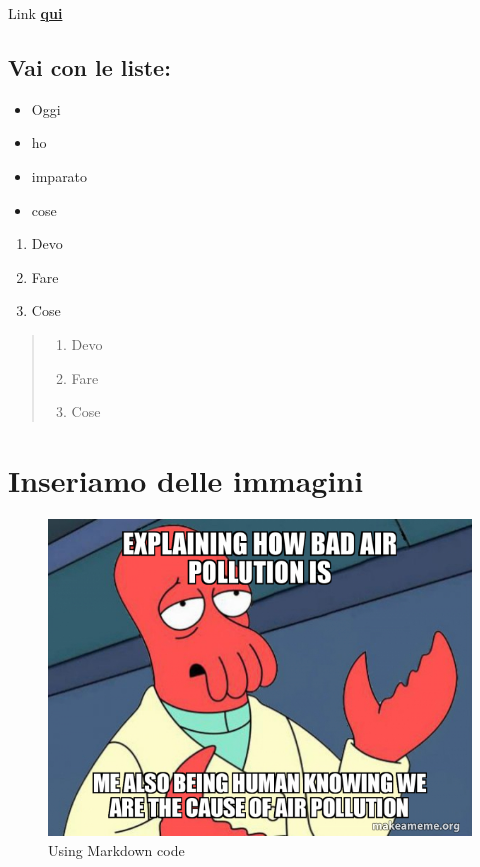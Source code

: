 \documentclass[
]{article}
\providecommand{\tightlist}{%
  \setlength{\itemsep}{0pt}\setlength{\parskip}{0pt}}
\begin{document}
Link \href{https://www.google.com}{\textbf{qui}}

\hypertarget{vai-con-le-liste}{%
\subsection{Vai con le liste:}\label{vai-con-le-liste}}

\begin{itemize}
\tightlist
\item
  Oggi
\item
  ho
\item
  imparato
\item
  cose
\end{itemize}

\begin{enumerate}
\def\labelenumi{\arabic{enumi}.}
\tightlist
\item
  Devo
\item
  Fare
\item
  Cose
\end{enumerate}

\begin{quote}
\begin{enumerate}
\def\labelenumi{\arabic{enumi}.}
\tightlist
\item
  Devo
\item
  Fare
\item
  Cose
\end{enumerate}
\end{quote}

\hypertarget{inseriamo-delle-immagini}{%
\section{Inseriamo delle immagini}\label{inseriamo-delle-immagini}}

\begin{figure}
\centering
\includegraphics{pics/explaining-how-bad-8943e8c056.jpg}
\caption{Using Markdown code}
\end{figure}
\end{document}
